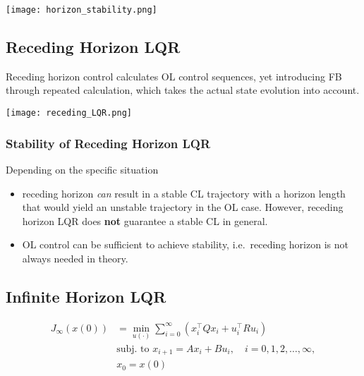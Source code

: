 \begin{center}
    \texttt{[image: horizon\_stability.png]}
\end{center}

\subsection{Receding Horizon LQR}

Receding horizon control calculates OL control sequences, yet introducing FB through repeated calculation, which takes the actual state evolution into account.

\begin{center}
    \texttt{[image: receding\_LQR.png]}
\end{center}

\subsubsection{Stability of Receding Horizon LQR}

Depending on the specific situation
\begin{itemize}
    \item receding horizon \textit{can} result in a stable CL trajectory with a horizon length that would yield an unstable trajectory in the OL case. However, receding horizon LQR does \textbf{not} guarantee a stable CL in general.
    \item OL control can be sufficient to achieve stability, i.e.\ receding horizon is not always needed in theory.
\end{itemize}

\subsection{Infinite Horizon LQR}

\begin{align*}
    J_\infty(x(0)) & =\min_{u(\cdot)}\sum_{i=0}^\infty\left(x_i^\top Qx_i+u_i^\top Ru_i\right) \\
                   & \text{subj.\ to }x_{i+1}=Ax_i+Bu_i,\quad i=0,1,2,\dots,\infty,            \\
                   & x_0=x(0)
\end{align*}

\newpar{}

